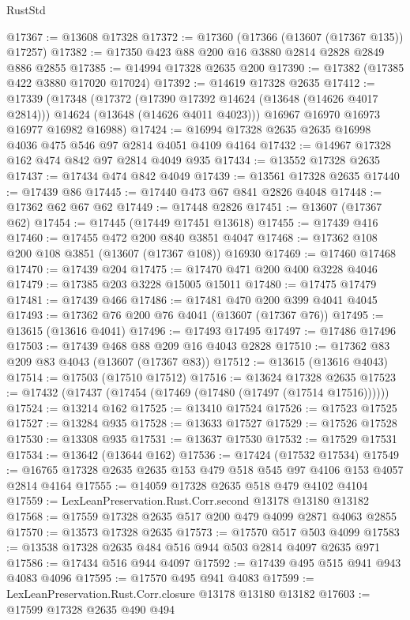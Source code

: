 \begin{lexlean}{RustStd}
\begin{coremodule}
@17367 := @13608 @17328
@17372 := @17360 (@17366 (@13607 (@17367 @135)) @17257)
@17382 := @17350 @423 @88 @200 @16 @3880 @2814 @2828 @2849 @886 @2855
@17385 := @14994 @17328 @2635 @200
@17390 := @17382 (@17385 @422 @3880 @17020 @17024)
@17392 := @14619 @17328 @2635
@17412 := @17339
    (@17348
      (@17372
        (@17390 @17392 @14624 (@13648 (@14626 @4017 @2814)))
        @14624
        (@13648 (@14626 @4011 @4023)))
      @16967
      @16970
      @16973
      @16977
      @16982
      @16988)
@17424 := @16994 @17328 @2635 @2635 @16998 @4036 @475 @546 @97 @2814 @4051 @4109 @4164
@17432 := @14967 @17328 @162 @474 @842 @97 @2814 @4049 @935
@17434 := @13552 @17328 @2635
@17437 := @17434 @474 @842 @4049
@17439 := @13561 @17328 @2635
@17440 := @17439 @86
@17445 := @17440 @473 @67 @841 @2826 @4048
@17448 := @17362 @62 @67 @62
@17449 := @17448 @2826
@17451 := @13607 (@17367 @62)
@17454 := @17445 (@17449 @17451 @13618)
@17455 := @17439 @416
@17460 := @17455 @472 @200 @840 @3851 @4047
@17468 := @17362 @108 @200 @108 @3851 (@13607 (@17367 @108)) @16930
@17469 := @17460 @17468
@17470 := @17439 @204
@17475 := @17470 @471 @200 @400 @3228 @4046
@17479 := @17385 @203 @3228 @15005 @15011
@17480 := @17475 @17479
@17481 := @17439 @466
@17486 := @17481 @470 @200 @399 @4041 @4045
@17493 := @17362 @76 @200 @76 @4041 (@13607 (@17367 @76))
@17495 := @13615 (@13616 @4041)
@17496 := @17493 @17495
@17497 := @17486 @17496
@17503 := @17439 @468 @88 @209 @16 @4043 @2828
@17510 := @17362 @83 @209 @83 @4043 (@13607 (@17367 @83))
@17512 := @13615 (@13616 @4043)
@17514 := @17503 (@17510 @17512)
@17516 := @13624 @17328 @2635
@17523 := @17432 (@17437 (@17454 (@17469 (@17480 (@17497 (@17514 @17516))))))
@17524 := @13214 @162
@17525 := @13410 @17524
@17526 := @17523 @17525
@17527 := @13284 @935
@17528 := @13633 @17527
@17529 := @17526 @17528
@17530 := @13308 @935
@17531 := @13637 @17530
@17532 := @17529 @17531
@17534 := @13642 (@13644 @162)
@17536 := @17424 (@17532 @17534)
@17549 := @16765 @17328 @2635 @2635 @153 @479 @518 @545 @97 @4106 @153 @4057 @2814 @4164
@17555 := @14059 @17328 @2635 @518 @479 @4102 @4104
@17559 := LexLeanPreservation.Rust.Corr.second @13178 @13180 @13182
@17568 := @17559 @17328 @2635 @517 @200 @479 @4099 @2871 @4063 @2855
@17570 := @13573 @17328 @2635
@17573 := @17570 @517 @503 @4099
@17583 := @13538 @17328 @2635 @484 @516 @944 @503 @2814 @4097 @2635 @971
@17586 := @17434 @516 @944 @4097
@17592 := @17439 @495 @515 @941 @943 @4083 @4096
@17595 := @17570 @495 @941 @4083
@17599 := LexLeanPreservation.Rust.Corr.closure @13178 @13180 @13182
@17603 := @17599 @17328 @2635 @490 @494

\end{coremodule}
\end{lexlean}
